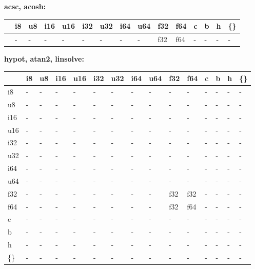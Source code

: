 \textbf{acsc, acosh:}
\begin{scriptsize}\begin{tt}\begin{center}\vspace{-.3cm}\begin{tabular}{|m{.65cm}||m{.65cm}|m{.65cm}|m{.65cm}|m{.65cm}|m{.65cm}|m{.65cm}|m{.65cm}|m{.65cm}|m{.65cm}|m{.65cm}|m{.65cm}|m{.65cm}|m{.65cm}|m{.65cm}|}\hline 
&i8&u8&i16&u16&i32&u32&i64&u64&f32&f64&c&b&h&\{\}\\ \hline \hline
&-&-&-&-&-&-&-&-&f32&f64&-&-&-&-\\ \hline
\end{tabular}\end{center}\end{tt}\end{scriptsize} 

\newpage
\textbf{hypot, atan2, linsolve:}
\begin{scriptsize}\begin{tt}\begin{center}\vspace{-.3cm}\begin{tabular}{|m{.65cm}||m{.65cm}|m{.65cm}|m{.65cm}|m{.65cm}|m{.65cm}|m{.65cm}|m{.65cm}|m{.65cm}|m{.65cm}|m{.65cm}|m{.65cm}|m{.65cm}|m{.65cm}|m{.65cm}|}\hline 
&i8&u8&i16&u16&i32&u32&i64&u64&f32&f64&c&b&h&\{\}\\ \hline \hline
i8&-&-&-&-&-&-&-&-&-&-&-&-&-&-\\ \hline
u8&-&-&-&-&-&-&-&-&-&-&-&-&-&-\\ \hline
i16&-&-&-&-&-&-&-&-&-&-&-&-&-&-\\ \hline
u16&-&-&-&-&-&-&-&-&-&-&-&-&-&-\\ \hline
i32&-&-&-&-&-&-&-&-&-&-&-&-&-&-\\ \hline
u32&-&-&-&-&-&-&-&-&-&-&-&-&-&-\\ \hline
i64&-&-&-&-&-&-&-&-&-&-&-&-&-&-\\ \hline
u64&-&-&-&-&-&-&-&-&-&-&-&-&-&-\\ \hline
f32&-&-&-&-&-&-&-&-&f32&f32&-&-&-&-\\ \hline
f64&-&-&-&-&-&-&-&-&f32&f64&-&-&-&-\\ \hline
c&-&-&-&-&-&-&-&-&-&-&-&-&-&-\\ \hline
b&-&-&-&-&-&-&-&-&-&-&-&-&-&-\\ \hline
h&-&-&-&-&-&-&-&-&-&-&-&-&-&-\\ \hline
\{\}&-&-&-&-&-&-&-&-&-&-&-&-&-&-\\ \hline
\end{tabular}\end{center}\end{tt}\end{scriptsize} 

